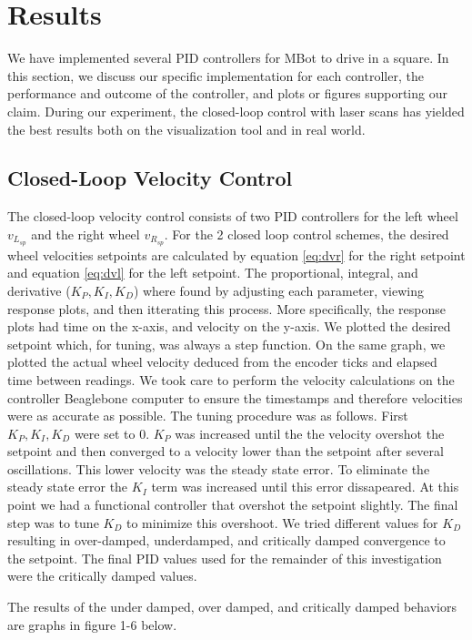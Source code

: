 \documentclass[conference]{IEEEtran}
\begin{document}
\section{Results}
We have implemented several PID controllers for MBot to drive in a square. In this section, we discuss our specific implementation for each controller, the performance and outcome of the controller, and plots or figures supporting our claim. During our experiment, the closed-loop control with laser scans has yielded the best results both on the visualization tool and in real world.


\subsection{Closed-Loop Velocity Control}
The closed-loop velocity control consists of two PID controllers for the left wheel $v_{L_{sp}}$ and the right wheel $v_{R_{sp}}$.
For the 2 closed loop control schemes, the desired wheel velocities setpoints are calculated by equation \ref{eq:dvr} for the right setpoint and equation \ref{eq:dvl} for the left setpoint.
The proportional, integral, and derivative ($K_{P}, K_{I}, K_{D}$) where found by adjusting each parameter, viewing response plots, and then itterating this process.
More specifically, the response plots had time on the x-axis, and velocity on the y-axis.  We plotted the desired setpoint which, for tuning, was always a step function.
On the same graph, we plotted the actual wheel velocity deduced from the encoder ticks and elapsed time between readings.  We took care to perform the velocity calculations
on the controller Beaglebone computer to ensure the timestamps and therefore velocities were as accurate as possible.  The tuning procedure was as follows.
First $K_{P}, K_{I}, K_{D}$ were set to 0. $K_{P}$ was increased until the the velocity overshot the setpoint and then converged to a velocity lower than the setpoint after several oscillations.
This lower velocity was the steady state error.  To eliminate the steady state error the $K_{I}$ term was increased until this error dissapeared.
At this point we had a functional controller that overshot the setpoint slightly.  The final step was to tune $K_{D}$ to minimize this overshoot.  We tried different values for
$K_{D}$ resulting in over-damped, underdamped, and critically damped convergence to the setpoint. The final PID values used for the remainder of this investigation were the critically damped values.

The results of the under damped, over damped, and critically damped behaviors are graphs in figure 1-6 below.
\end{document}
